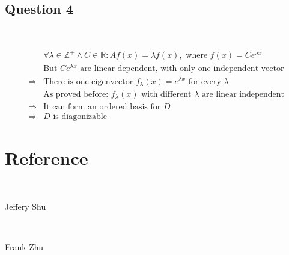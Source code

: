 \documentclass{article}
\begin{document}
\subsection{Question 4}

~

\begin{equation*}
    \begin{split}
        &\forall \lambda \in \mathbb{Z}^+ \land C \in \mathbb{R} : Af(x)=\lambda f(x), \text{ where }f(x)=Ce^{\lambda x}\\
        &\text{But }Ce^{\lambda x}\text{ are linear dependent, with only one independent vector}\\
        \Rightarrow&\text{There is one eigenvector }f_\lambda(x)=e^{\lambda x}\text{ for every }\lambda\\
        &\text{As proved before: }f_\lambda(x)\text{ with different }\lambda\text{ are linear independent}\\
        \Rightarrow&\text{It can form an ordered basis for }D\\
        \Rightarrow&D\text{ is diagonizable}
    \end{split}
\end{equation*}

\newpage

\section{Reference}

~

Jeffery Shu

~

Frank Zhu
\end{document}
